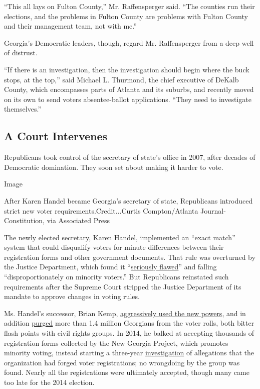 ``This all lays on Fulton County,'' Mr. Raffensperger said. ``The
counties run their elections, and the problems in Fulton County are
problems with Fulton County and their management team, not with me.''

Georgia's Democratic leaders, though, regard Mr. Raffensperger from a
deep well of distrust.

``If there is an investigation, then the investigation should begin
where the buck stops, at the top,'' said Michael L. Thurmond, the chief
executive of DeKalb County, which encompasses parts of Atlanta and its
suburbs, and recently moved on its own to send voters absentee-ballot
applications. ``They need to investigate themselves.''

\hypertarget{a-court-intervenes}{%
\subsection{A Court Intervenes}\label{a-court-intervenes}}

Republicans took control of the secretary of state's office in 2007,
after decades of Democratic domination. They soon set about making it
harder to vote.

Image

After Karen Handel became Georgia's secretary of state, Republicans
introduced strict new voter requirements.Credit...Curtis Compton/Atlanta
Journal-Constitution, via Associated Press

The newly elected secretary, Karen Handel, implemented an ``exact
match'' system that could disqualify voters for minute differences
between their registration forms and other government documents. That
rule was overturned by the Justice Department, which found it
``\href{https://www.justice.gov/crt/voting-determination-letter-58}{seriously
flawed}'' and falling ``disproportionately on minority voters.'' But
Republicans reinstated such requirements after the Supreme Court
stripped the Justice Department of its mandate to approve changes in
voting rules.

Ms. Handel's successor, Brian Kemp,
\href{https://www.bloomberg.com/news/articles/2018-10-15/how-georgia-s-exact-match-program-was-made-possible}{aggressively
used the new powers}, and in addition
\href{https://www.nytimes3xbfgragh.onion/2019/03/06/us/politics/governor-brian-kemp-voter-suppression.html}{purged}
more than 1.4 million Georgians from the voter rolls, both bitter flash
points with civil rights groups. In 2014, he balked at accepting
thousands of registration forms collected by the New Georgia Project,
which promotes minority voting, instead starting a three-year
\href{https://www.wsbtv.com/news/local/state-launches-fraud-investigation-voter-registrat/137992052/}{investigation}
of allegations that the organization had forged voter registrations; no
wrongdoing by the group was found. Nearly all the registrations were
ultimately accepted, though many came too late for the 2014 election.

